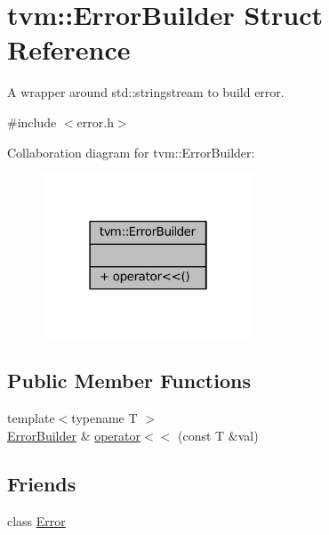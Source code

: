 \hypertarget{structtvm_1_1ErrorBuilder}{}\section{tvm\+:\+:Error\+Builder Struct Reference}
\label{structtvm_1_1ErrorBuilder}


A wrapper around std\+::stringstream to build error.  




{\ttfamily \#include $<$error.\+h$>$}



Collaboration diagram for tvm\+:\+:Error\+Builder\+:
\nopagebreak
\begin{figure}[H]
\begin{center}
\leavevmode
\includegraphics[width=178pt]{structtvm_1_1ErrorBuilder__coll__graph}
\end{center}
\end{figure}
\subsection*{Public Member Functions}
\begin{DoxyCompactItemize}
\item 
{\footnotesize template$<$typename T $>$ }\\\hyperlink{structtvm_1_1ErrorBuilder}{Error\+Builder} \& \hyperlink{structtvm_1_1ErrorBuilder_ad40b754d2d8992b65d0bc5b116bd3f71}{operator$<$$<$} (const T \&val)
\end{DoxyCompactItemize}
\subsection*{Friends}
\begin{DoxyCompactItemize}
\item 
class \hyperlink{structtvm_1_1ErrorBuilder_a16d3937baa3679c525821223427be40b}{Error}
\end{DoxyCompactItemize}


